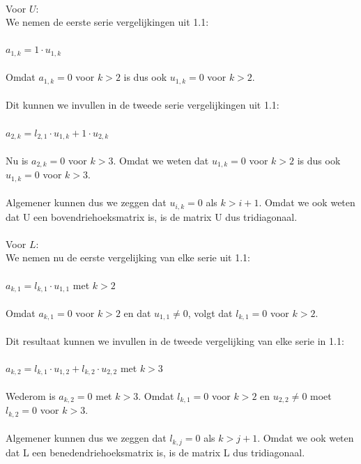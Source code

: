 \documentclass[a4paper]{article}
\begin{document}
\begin{tabbing}
\\ \textbullet{ }Voor $U$:
\\We nemen de eerste serie vergelijkingen uit 1.1:
\\{}
\\$a_{1,k} = 1 \cdot u_{1,k}$
\\{}
\\Omdat $a_{1,k} = 0$ voor $k > 2$ is dus ook $u_{1,k} = 0$ voor $k > 2$.
\\{}
\\Dit kunnen we invullen in de tweede serie vergelijkingen uit 1.1:
\\{}
\\$a_{2,k} = l_{2,1} \cdot u_{1,k} + 1 \cdot u_{2,k}$ 
\\{}
\\Nu is $a_{2,k} = 0$ voor $k > 3$. Omdat we weten dat $u_{1,k} = 0$ voor $k > 2$ is dus ook $u_{1,k} = 0$ voor $k > 3$.
\\{}
\\Algemener kunnen dus we zeggen dat $u_{i,k} = 0$ als $k > i + 1$. Omdat we ook weten dat U een bovendriehoeksmatrix is, is de matrix U dus tridiagonaal.
\\{}
\\ \textbullet { }Voor $L$:
\\We nemen nu de eerste vergelijking van elke serie uit 1.1:
\\{}
\\$a_{k,1} = l_{k,1} \cdot u_{1,1}$ met $k > 2$
\\{}
\\Omdat $a_{k,1} = 0$ voor $k > 2$ en dat $u_{1,1} \neq 0$, volgt dat $l_{k,1} = 0$ voor $k > 2$.
\\{}
\\Dit resultaat kunnen we invullen in de tweede vergelijking van elke serie in 1.1:
\\{}
\\$a_{k,2} = l_{k,1} \cdot u_{1,2} + l_{k,2} \cdot u_{2,2}$ met $k > 3$
\\{}
\\Wederom is $a_{k,2} = 0$ met $k > 3$. Omdat $l_{k,1} = 0$ voor $k > 2$ en $u_{2,2} \neq 0$ moet $l_{k,2} = 0$ voor $k > 3$.
\\{}
\\Algemener kunnen dus we zeggen dat $l_{k,j} = 0$ als $k > j + 1$. Omdat we ook weten dat L een benedendriehoeksmatrix is, is de matrix L dus tridiagonaal.
\\{}
\end{tabbing}
\end{document}
